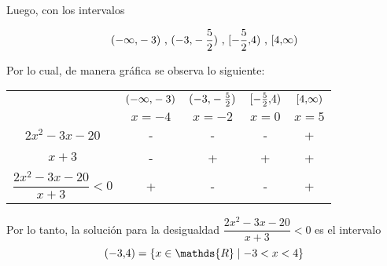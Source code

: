 \documentclass[a4paper,12pt]{article}
\begin{document}
Luego, con los intervalos

\[  \interval({-\infty,-3}) \text{ , } \interval({-3, -\frac{5}{2}}) \text{ , } \interval[{-\frac{5}{2},4}) \text{ , } \interval[{4, \infty}) \]

\vspace{0.5cm}

Por lo cual, de manera gráfica se observa lo siguiente:

\bgroup
\def\arraystretch{1.5}%
\begin{table}[ht!]
\begin{center}
\begin{tabular}{ c | c  c  c c}
		& $\interval({-\infty,-3}) $ & $ \interval({-3, -\frac{5}{2}}) $ & $ \interval[{-\frac{5}{2},4}) $ & $ \interval[{4, \infty}) $ \\ [0.5ex]
	& $x=-4$ & $x=-2$ & $x=0$ & $x=5$\\ 	\hline
	$2x^2 -3x -20$ & - & - & - & +\\
	$x+3$ & - & + & + & +\\
	$\dfrac{2x^2 -3x -20}{x+3} < 0$ & + & - & - & +\\ 
\end{tabular}
\end{center}
\end{table}


Por lo tanto, la solución para la desigualdad $\dfrac{2x^2 -3x -20}{x+3} < 0$ es el intervalo \\

\[ \interval({-3, 4})  = \{ x \in \mathds{R} \mid -3 < x <4 \} \]
\end{document}
